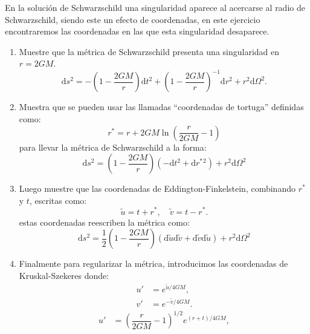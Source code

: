 \documentclass[../main]{subfiles}
\begin{document}
\begin{adjustwidth}{0pt}{-100pt}
\begin{enumerate}
    En la solución de Schwarzschild una singularidad aparece al acercarse al radio de Schwarzschild, siendo este un efecto de coordenadas, en este ejercicio encontraremos las coordenadas en las que esta singularidad desaparece.
    \begin{enumerate}[label=(\alph*)]
        \item Muestre que la métrica de Schwarzschild presenta una singularidad en $r=2GM$.
        \begin{equation}
            \mathrm{d}s^2=-\left(1-\dfrac{2GM}{r}\right)\mathrm{d}t^2+\left(1-\dfrac{2GM}{r}\right)^{-1}\mathrm{d}r^2+r^2\mathrm{d}\Omega^2.
        \end{equation}
        \item Muestra que se pueden usar las llamadas ``coordenadas de tortuga'' definidas como:
        \begin{equation}
            r^*=r+2GM\ln\left(\dfrac{r}{2GM}-1\right)
        \end{equation}
        para llevar la métrica de Schwarzschild a la forma:
        \begin{equation}
            \mathrm{d}s^2=\left(1-\dfrac{2GM}{r}\right)(-\mathrm{d}t^2+\mathrm{d}r^*{}^2)+r^2\mathrm{d}\Omega^2
        \end{equation}
        \item Luego muestre que las coordenadas de Eddington-Finkelstein, combinando $r^*$ y $t$, escritas como:
        \begin{equation}
            \tilde{u}=t+r^*, \quad \tilde{v}=t-r^*.
        \end{equation}
        estas coordenadas reescriben la métrica como:
        \begin{equation}
            \mathrm{d}s^2=\dfrac{1}{2}\left(1-\dfrac{2GM}{r}\right)(\mathrm{d}\tilde{u}\mathrm{d}\tilde{v}+\mathrm{d}\tilde{v}\mathrm{d}\tilde{u})+r^2\mathrm{d}\Omega^2
        \end{equation}
        \item Finalmente para regularizar la métrica, introducimos las coordenadas de Kruskal-Szekeres donde:
        \begin{align}
            u'&=e^{\tilde{u}/4GM},\\
            v'&=e^{-\tilde{v}/4GM}.
        \end{align}
        \vspace{-0.7cm}
        \begin{align}
            u'&=\left(\dfrac{r}{2GM}-1\right)^{1/2}e^{(r+t)/4GM},\\

\end{align}
\end{enumerate}
\end{enumerate}
\end{adjustwidth}
\end{document}
